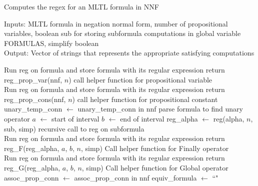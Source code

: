 \documentclass[runningheads]{llncs}
\begin{document}
\begin{algorithm}[H]
\caption{Computes the regex for an MLTL formula in NNF}
Inputs: MLTL formula in negation normal form, number of propositional variables, boolean sub for storing subformula computations in global variable FORMULAS, simplify boolean\\
Output: Vector of strings that represents the appropriate satisfying computations
\begin{algorithmic}
            \State Run reg on formula and store formula with its regular expression
        \EndIf
        \State return reg\_prop\_var(nnf, $n$)
        \Comment call helper function for propositional variable
    \EndIf\\
            \State Run reg on formula and store formula with its regular expression
        \EndIf
        \State return reg\_prop\_cons(nnf, $n$)
        \Comment call helper function for propositional constant
    \EndIf
    \\
        \State unary\_temp\_conn $\leftarrow$ unary\_temp\_conn in nnf
        \Comment parse formula to find unary operator
        \State $a$ $\leftarrow$ start of interval
        \State $b$ $\leftarrow$ end of interval
        \State reg\_alpha $\leftarrow$ reg(alpha, $n$, sub, simp)
        \Comment recursive call to reg on subformula\\
                \State Run reg on formula and store formula with its regular expression
            \EndIf
            \State return reg\_F(reg\_alpha, $a$, $b$, $n$, simp)
            \Comment Call helper function for Finally operator
        \EndIf\\
                \State Run reg on formula and store formula with its regular expression
            \EndIf
            \State return reg\_G(reg\_alpha, $a$, $b$, $n$, simp)
            \Comment Call helper function for Global operator
        \EndIf
    \EndIf
    \\
        \State assoc\_prop\_conn $\leftarrow$ assoc\_prop\_conn in nnf
        \State equiv\_formula $\leftarrow$ ``" 

\end{algorithmic}
\end{algorithm}
\end{document}
